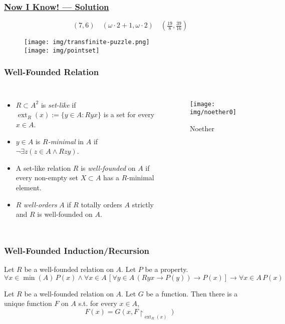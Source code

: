 \documentclass[UTF8,aspectratio=43,11pt,colorlinks,compress,openany]{beamer}%
\begin{document}
\begin{frame}\frametitle{\href{http://jdh.hamkins.org/transfinite-epistemic-logic-puzzle-challenge/}{Now I Know! --- Solution}}
\vspace{-3ex}
	\[(7,6)\quad(\omega\cdot 2+1,\omega\cdot 2)\quad(\tfrac{19}{8},\tfrac{39}{16})\]\vspace{-3ex}
	\begin{figure}
		\texttt{[image: img/transfinite-puzzle.png]}\\
		\texttt{[image: img/pointset]}
	\end{figure}
\end{frame}

\begin{frame}\frametitle{Well-Founded Relation}
\begin{columns}
\begin{itemize}
\item $R\subset A^2$ is \emph{set-like} if $\operatorname{ext}_R(x):=\{y\in A: Ryx\}$ is a set for every $x\in A$.
\item $y\in A$ is \emph{$R$-minimal} in $A$ if $\neg\exists z(z\in A\wedge Rzy)$.
\item A set-like relation $R$ is \emph{well-founded} on $A$ if every non-empty set $X\subset A$ has a $R$-minimal element.
\item $R$ \emph{well-orders} $A$ if $R$ totally orders $A$ strictly and $R$ is well-founded on $A$.
\end{itemize}
	\begin{figure}
		\texttt{[image: img/noether0]}\caption{Noether}
	\end{figure}
\end{columns}
\end{frame}

\begin{frame}\frametitle{Well-Founded Induction/Recursion}
\begin{theorem}
Let $R$ be a well-founded relation on $A$. Let $P$ be a property.
\[\forall x\in \min(A)\,P(x)\wedge \forall x\in A\,[\forall y\in A\,(Ryx\to P(y))\to P(x)]\to \forall x\in A\,P(x)\]
\end{theorem}
\begin{theorem}
Let $R$ be a well-founded relation on $A$. Let $G$ be a function. Then there is a unique function $F$ on $A$ s.t. for every $x\in A$,
\[F(x)=G(x,F{\restriction_{\operatorname{ext}_R(x)}})\]
\end{theorem}
\end{frame}
\end{document}
